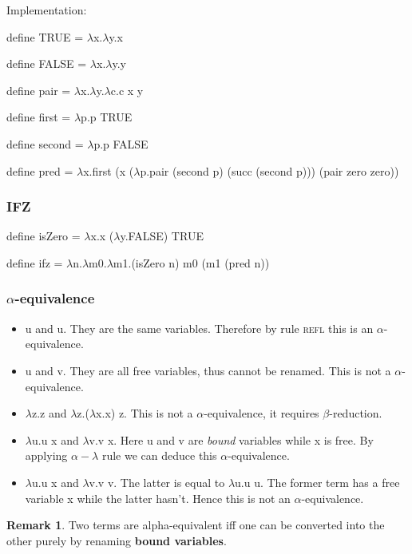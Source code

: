 \documentclass{article}
\theoremstyle{definition}
\newtheorem*{remark}{Remark}
\newcommand{\lb}{$\lambda$}
\begin{document}
Implementation:

\begin{tcolorbox}
    \textsf{define} TRUE = \lb x.\lb y.x

    \textsf{define} FALSE = \lb x.\lb y.y

    \textsf{define} pair = \lb x.\lb y.\lb c.c x y

    \textsf{define} first = \lb p.p TRUE

    \textsf{define} second = \lb p.p FALSE

    \textsf{define} pred = \lb x.first (x (\lb p.pair (second p) (succ (second p))) (pair zero zero))
\end{tcolorbox}

\subsubsection*{IFZ}

\begin{tcolorbox}
    \textsf{define} isZero = \lb x.x (\lb y.FALSE) TRUE

    \textsf{define} ifz = \lb n.\lb m0.\lb m1.(isZero n) m0 (m1 (pred n))
\end{tcolorbox}

\subsubsection*{$\alpha$-equivalence}

\begin{itemize}
    \item u and u. They are the same variables.
          Therefore by rule \textsc{refl} this is an $\alpha$-equivalence.
    \item u and v. They are all free variables, thus cannot be renamed. This is not a $\alpha$-equivalence.
    \item \lb z.z and \lb z.(\lb x.x) z. This is not a $\alpha$-equivalence, it requires $\beta$-reduction.
    \item \lb u.u x and \lb v.v x. Here u and v are \emph{bound} variables while x is free. By applying $\alpha-\lambda$ rule we can deduce this $\alpha$-equivalence.
    \item \lb u.u x and \lb v.v v. The latter is equal to \lb u.u u.
          The former term has a free variable x while the latter hasn't.
          Hence this is not an $\alpha$-equivalence.
\end{itemize}

\begin{remark}
    Two terms are alpha-equivalent iff one can be converted into the other purely by renaming \textbf{bound variables}.
\end{remark}
\end{document}
